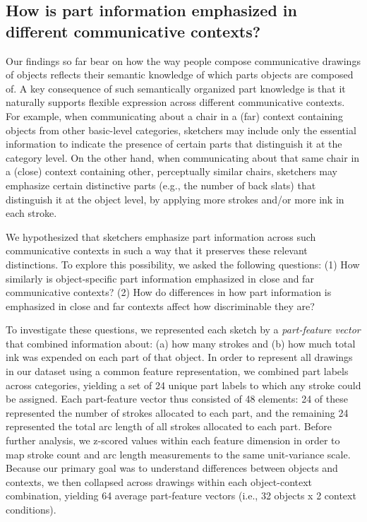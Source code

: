 \documentclass[10pt,letterpaper]{article}
\begin{document}
\subsection{How is part information emphasized in different communicative contexts?}

Our findings so far bear on how the way people compose communicative drawings of objects reflects their semantic knowledge of which parts objects are composed of. 
A key consequence of such semantically organized part knowledge is that it naturally supports flexible expression across different communicative contexts. 
For example, when communicating about a chair in a (far) context containing objects from other basic-level categories, sketchers may include only the essential information to indicate the presence of certain parts that distinguish it at the category level. 
On the other hand, when communicating about that same chair in a (close) context containing other, perceptually similar chairs, sketchers may emphasize certain distinctive parts (e.g., the number of back slats) that distinguish it at the object level, by applying more strokes and/or more ink in each stroke.

We hypothesized that sketchers emphasize part information across such communicative contexts in such a way that it preserves these relevant distinctions. 
To explore this possibility, we asked the following questions: 
(1) How similarly is object-specific part information emphasized in close and far communicative contexts? 
(2) How do differences in how part information is emphasized in close and far contexts affect how discriminable they are?

To investigate these questions, we represented each sketch by a \textit{part-feature vector} that combined information about: (a) how many strokes and (b) how much total ink was expended on each part of that object. 
In order to represent all drawings in our dataset using a common feature representation, we combined part labels across categories, yielding a set of 24 unique part labels to which any stroke could be assigned. 
Each part-feature vector thus consisted of 48 elements: 24 of these represented the number of strokes allocated to each part, and the remaining 24 represented the total arc length of all strokes allocated to each part. 
Before further analysis, we z-scored values within each feature dimension in order to map stroke count and arc length measurements to the same unit-variance scale. 
Because our primary goal was to understand differences between objects and contexts, we then collapsed across drawings within each object-context combination, yielding 64 average part-feature vectors (i.e., 32 objects x 2 context conditions). 
\end{document}
